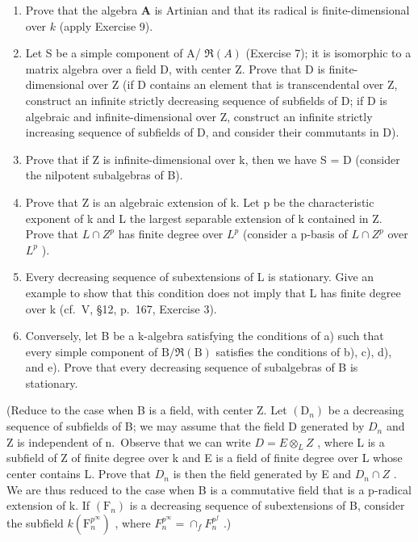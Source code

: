 \begin{enumerate}
\def\labelenumi{\alph{enumi})}
\item
  Prove that the algebra \(\mathbf{A}\) is Artinian and that its radical is finite-dimensional over \(k\) (apply Exercise 9).
\item
  Let S be a simple component of A/ \(\Re(A)\) (Exercise 7); it is isomorphic to a matrix algebra over a field D, with center Z. Prove that D is finite-dimensional over Z (if D contains an element that is transcendental over Z, construct an infinite strictly decreasing sequence of subfields of D; if D is algebraic and infinite-dimensional over Z, construct an infinite strictly increasing sequence of subfields of D, and consider their commutants in D).
\item
  Prove that if Z is infinite-dimensional over k, then we have S = D (consider the nilpotent subalgebras of B).
\item
  Prove that Z is an algebraic extension of k. Let p be the characteristic exponent of k and L the largest separable extension of k contained in Z. Prove that \(L \cap Z^{p}\) has finite degree over \(L^{p}\) (consider a p-basis of \(L \cap Z^{p}\) over \(L^{p}\) ).
\item
  Every decreasing sequence of subextensions of L is stationary. Give an example to show that this condition does not imply that L has finite degree over k (cf.~V, §12, p.~167, Exercise 3).
\item
  Conversely, let B be a k-algebra satisfying the conditions of a) such that every simple component of \(\mathrm{B}/\Re(\mathrm{B})\) satisfies the conditions of b), c), d), and e). Prove that every decreasing sequence of subalgebras of B is stationary.
\end{enumerate}

(Reduce to the case when B is a field, with center Z. Let \((\mathrm{D}_{n})\) be a decreasing sequence of subfields of B; we may assume that the field D generated by \(D_{n}\) and Z is independent of n.~Observe that we can write \(D = E \otimes_{L} Z\) , where L is a subfield of Z of finite degree over k and E is a field of finite degree over L whose center contains L. Prove that \(D_{n}\) is then the field generated by E and \(D_{n} \cap Z\) . We are thus reduced to the case when B is a commutative field that is a p-radical extension of k. If \((\mathrm{F}_{n})\) is a decreasing sequence of subextensions of B, consider the subfield \(k(\mathrm{F}_{n}^{p^{\infty}})\) , where \(F_{n}^{p^{\infty}} = \cap_{f} F_{n}^{p^{f}}\) .)


